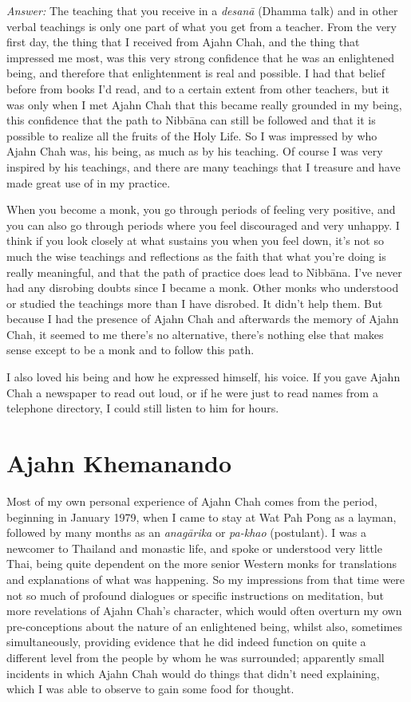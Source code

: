 \emph{Answer:} The teaching that you receive in a \emph{desanā} (Dhamma
talk) and in other verbal teachings is only one part of what you get
from a teacher. From the very first day, the thing that I received from
Ajahn Chah, and the thing that impressed me most, was this very strong
confidence that he was an enlightened being, and therefore that
enlightenment is real and possible. I had that belief before from books
I'd read, and to a certain extent from other teachers, but it was only
when I met Ajahn Chah that this became really grounded in my being, this
confidence that the path to Nibbāna can still be followed and that it is
possible to realize all the fruits of the Holy Life. So I was impressed
by who Ajahn Chah was, his being, as much as by his teaching. Of course
I was very inspired by his teachings, and there are many teachings that
I treasure and have made great use of in my practice.

When you become a monk, you go through periods of feeling very positive,
and you can also go through periods where you feel discouraged and very
unhappy. I think if you look closely at what sustains you when you feel
down, it's not so much the wise teachings and reflections as the faith
that what you're doing is really meaningful, and that the path of
practice does lead to Nibbāna. I've never had any disrobing doubts since
I became a monk. Other monks who understood or studied the teachings
more than I have disrobed. It didn't help them. But because I had the
presence of Ajahn Chah and afterwards the memory of Ajahn Chah, it
seemed to me there's no alternative, there's nothing else that makes
sense except to be a monk and to follow this path.

I also loved his being and how he expressed himself, his voice. If you
gave Ajahn Chah a newspaper to read out loud, or if he were just to read
names from a telephone directory, I could still listen to him for hours.

\section{Ajahn Khemanando}

Most of my own personal experience of Ajahn Chah comes from the period,
beginning in January 1979, when I came to stay at Wat Pah Pong as a
layman, followed by many months as an \emph{anagārika} or \emph{pa-khao}
(postulant). I was a newcomer to Thailand and monastic life, and spoke
or understood very little Thai, being quite dependent on the more senior
Western monks for translations and explanations of what was happening.
So my impressions from that time were not so much of profound dialogues
or specific instructions on meditation, but more revelations of Ajahn
Chah's character, which would often overturn my own pre-conceptions
about the nature of an enlightened being, whilst also, sometimes
simultaneously, providing evidence that he did indeed function on quite
a different level from the people by whom he was surrounded; apparently
small incidents in which Ajahn Chah would do things that didn't need
explaining, which I was able to observe to gain some food for thought.

